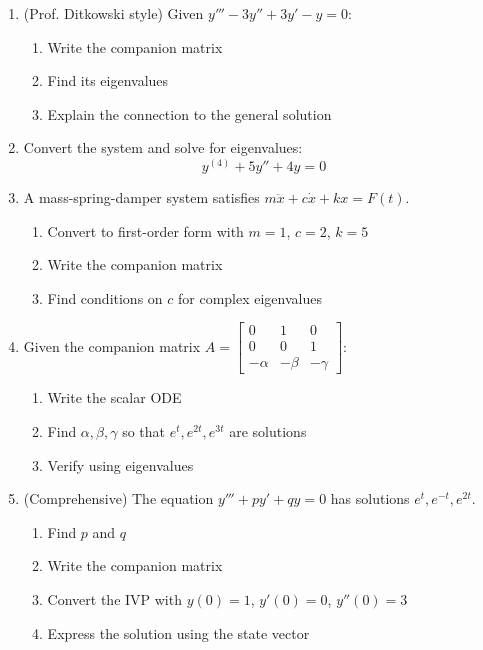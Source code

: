 \documentclass[12pt]{article}
\begin{document}
\begin{enumerate}[resume]
\item (Prof. Ditkowski style) Given $y''' - 3y'' + 3y' - y = 0$:
\begin{enumerate}[label=(\alph*)]
\item Write the companion matrix
\item Find its eigenvalues
\item Explain the connection to the general solution
\end{enumerate}

\item Convert the system and solve for eigenvalues:
$$y^{(4)} + 5y'' + 4y = 0$$

\item A mass-spring-damper system satisfies $m\ddot{x} + c\dot{x} + kx = F(t)$.
\begin{enumerate}[label=(\alph*)]
\item Convert to first-order form with $m=1$, $c=2$, $k=5$
\item Write the companion matrix
\item Find conditions on $c$ for complex eigenvalues
\end{enumerate}

\item Given the companion matrix $A = \begin{bmatrix} 0 & 1 & 0 \\ 0 & 0 & 1 \\ -\alpha & -\beta & -\gamma \end{bmatrix}$:
\begin{enumerate}[label=(\alph*)]
\item Write the scalar ODE
\item Find $\alpha, \beta, \gamma$ so that $e^{t}, e^{2t}, e^{3t}$ are solutions
\item Verify using eigenvalues
\end{enumerate}

\item (Comprehensive) The equation $y''' + py' + qy = 0$ has solutions $e^{t}, e^{-t}, e^{2t}$.
\begin{enumerate}[label=(\alph*)]
\item Find $p$ and $q$
\item Write the companion matrix
\item Convert the IVP with $y(0) = 1$, $y'(0) = 0$, $y''(0) = 3$
\item Express the solution using the state vector
\end{enumerate}
\end{enumerate}
\end{document}
